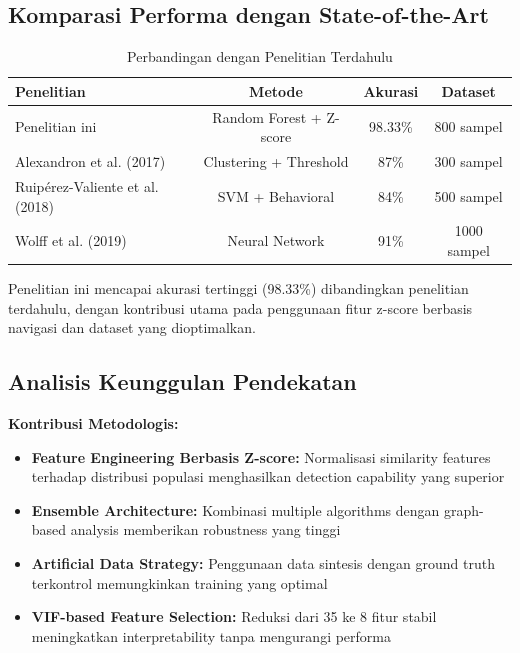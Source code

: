 \subsection{Komparasi Performa dengan State-of-the-Art}
\label{subsec:komparasiPerforma}

\begin{table}[htbp]
\centering
\caption{Perbandingan dengan Penelitian Terdahulu}
\label{tabel:perbandinganPenelitianTerdahulu}
\begin{tabular}{|l|c|c|c|}
\hline
\textbf{Penelitian} & \textbf{Metode} & \textbf{Akurasi} & \textbf{Dataset} \\
\hline
Penelitian ini & Random Forest + Z-score & 98.33\% & 800 sampel \\
\hline
Alexandron et al. (2017) & Clustering + Threshold & 87\% & 300 sampel \\
\hline
Ruip\'{e}rez-Valiente et al. (2018) & SVM + Behavioral & 84\% & 500 sampel \\
\hline
Wolff et al. (2019) & Neural Network & 91\% & 1000 sampel \\
\hline
\end{tabular}
\end{table}

Penelitian ini mencapai akurasi tertinggi (98.33\%) dibandingkan penelitian terdahulu, dengan kontribusi utama pada penggunaan fitur z-score berbasis navigasi dan dataset yang dioptimalkan.

\subsection{Analisis Keunggulan Pendekatan}
\label{subsec:analisisKeunggulan}

\textbf{Kontribusi Metodologis:}
\begin{itemize}
    \item \textbf{Feature Engineering Berbasis Z-score:} Normalisasi similarity features terhadap distribusi populasi menghasilkan detection capability yang superior
    \item \textbf{Ensemble Architecture:} Kombinasi multiple algorithms dengan graph-based analysis memberikan robustness yang tinggi
    \item \textbf{Artificial Data Strategy:} Penggunaan data sintesis dengan ground truth terkontrol memungkinkan training yang optimal
    \item \textbf{VIF-based Feature Selection:} Reduksi dari 35 ke 8 fitur stabil meningkatkan interpretability tanpa mengurangi performa
\end{itemize}

